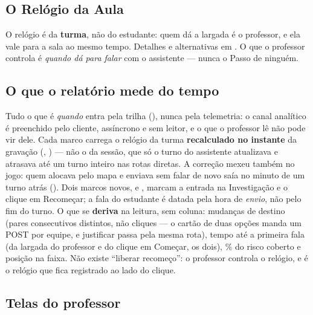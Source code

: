 \subsection{O Relógio da Aula}

O relógio é da \textbf{turma}, não do estudante: quem dá a largada é o professor, e
ela vale para a sala ao mesmo tempo. Detalhes e alternativas em . O
que o professor controla é \emph{quando dá para falar} com o assistente --- nunca
o Passo de ninguém.

\subsection{O que o relatório mede do tempo}

Tudo o que é \emph{quando} entra pela trilha (), nunca
pela telemetria: o canal analítico é preenchido pelo cliente, assíncrono e sem
leitor, e o que o professor lê não pode vir dele. Cada marco carrega o relógio
da turma \textbf{recalculado no instante} da gravação (,
) --- não o  da sessão, que só o
turno do assistente atualizava e atrasava até um turno inteiro nas rotas
diretas. A correção mexeu também no jogo: quem alocava pelo mapa e enviava sem
falar de novo saía no minuto de um turno atrás (). Dois marcos
novos,  e , marcam a entrada na Investigação e o clique
em Recomeçar; a fala do estudante é datada pela hora de \emph{envio}, não pelo
fim do turno. O que se \textbf{deriva} na leitura, sem coluna: mudanças de
destino (pares consecutivos distintos, não cliques --- o cartão de duas opções
manda um POST por equipe, e justificar passa pela mesma rota), tempo até a
primeira fala (da largada do professor e do clique em Começar, os dois), \% do
risco coberto e posição na faixa. Não existe \enquote{liberar recomeço}: o
professor controla o relógio, e é o relógio que fica registrado ao lado do
clique.

\subsection{Telas do professor}

